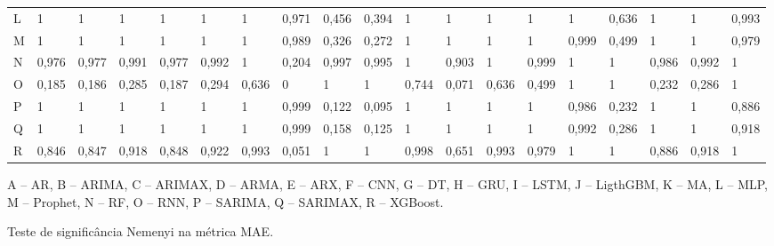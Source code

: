 \begin{landscape}
\begin{table}[!htb]
\begin{tabular}{@{}lllllllllllllllllll@{}}
L      & 1     & 1     & 1     & 1     & 1     & 1     & 0,971 & 0,456 & 0,394 & 1     & 1     & 1     & 1     & 1     & 0,636 & 1     & 1     & 0,993 \\
M      & 1     & 1     & 1     & 1     & 1     & 1     & 0,989 & 0,326 & 0,272 & 1     & 1     & 1     & 1     & 0,999 & 0,499 & 1     & 1     & 0,979 \\
N      & 0,976 & 0,977 & 0,991 & 0,977 & 0,992 & 1     & 0,204 & 0,997 & 0,995 & 1     & 0,903 & 1     & 0,999 & 1     & 1     & 0,986 & 0,992 & 1     \\
O      & 0,185 & 0,186 & 0,285 & 0,187 & 0,294 & 0,636 & 0     & 1     & 1     & 0,744 & 0,071 & 0,636 & 0,499 & 1     & 1     & 0,232 & 0,286 & 1     \\
P      & 1     & 1     & 1     & 1     & 1     & 1     & 0,999 & 0,122 & 0,095 & 1     & 1     & 1     & 1     & 0,986 & 0,232 & 1     & 1     & 0,886 \\
Q      & 1     & 1     & 1     & 1     & 1     & 1     & 0,999 & 0,158 & 0,125 & 1     & 1     & 1     & 1     & 0,992 & 0,286 & 1     & 1     & 0,918 \\
R      & 0,846 & 0,847 & 0,918 & 0,848 & 0,922 & 0,993 & 0,051 & 1     & 1     & 0,998 & 0,651 & 0,993 & 0,979 & 1     & 1     & 0,886 & 0,918 & 1     \\ \bottomrule
\end{tabular}
	\vspace{2mm}
	
	\captionsetup{justification=centering} %
	A -- AR,
	B -- ARIMA,
	C -- ARIMAX,
	D -- ARMA,
	E -- ARX,
	F -- CNN,
	G -- DT,
	H -- GRU,
	I -- LSTM,
	J -- LigthGBM,
	K -- MA,
	L -- MLP,
	M -- Prophet,
	N -- RF,
	O -- RNN,
	P -- SARIMA,
	Q -- SARIMAX,
	R -- XGBoost.
	
\end{table}

	\begin{table}[!htb]
	\caption{Teste de significância Nemenyi na métrica MAE.}\label{tb:nemenyi1}
	\centering


\end{table}
\end{landscape}
